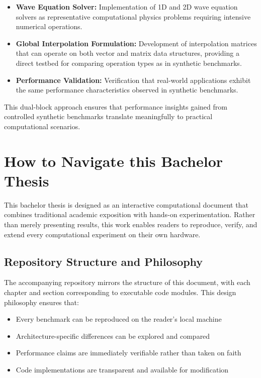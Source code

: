 \begin{itemize}
    \item \textbf{Wave Equation Solver:} Implementation of 1D and 2D wave equation solvers as representative computational physics problems requiring intensive numerical operations.
    
    \item \textbf{Global Interpolation Formulation:} Development of interpolation matrices that can operate on both vector and matrix data structures, providing a direct testbed for comparing operation types as in synthetic benchmarks.
    
    \item \textbf{Performance Validation:} Verification that real-world applications exhibit the same performance characteristics observed in synthetic benchmarks.
\end{itemize}

\vspace{0.5em}

This dual-block approach ensures that performance insights gained from controlled synthetic benchmarks translate meaningfully to practical computational scenarios.

\clearpage

\section{How to Navigate this Bachelor Thesis}

This bachelor thesis is designed as an interactive computational document that combines traditional academic exposition with hands-on experimentation. Rather than merely presenting results, this work enables readers to reproduce, verify, and extend every computational experiment on their own hardware.

\subsection*{Repository Structure and Philosophy}

The accompanying repository mirrors the structure of this document, with each chapter and section corresponding to executable code modules. This design philosophy ensures that:

\begin{itemize}
    \item Every benchmark can be reproduced on the reader's local machine
    \item Architecture-specific differences can be explored and compared
    \item Performance claims are immediately verifiable rather than taken on faith
    \item Code implementations are transparent and available for modification
\end{itemize}

